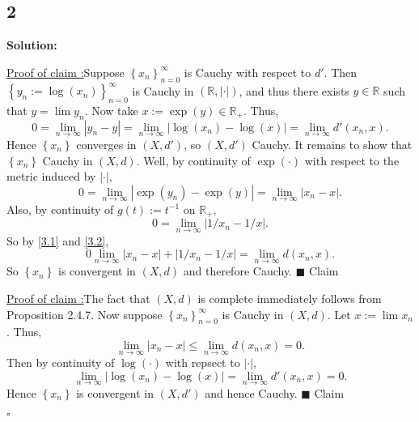 \documentclass[12pt]{article}
\newcounter{ProofCounter}
\newcounter{ClaimCounter}[ProofCounter]
\newenvironment{Solution}{\stepcounter{ProofCounter}\textbf{Solution:}}{\hfill$\square$}
\newenvironment{claim}[1]{\vspace{1mm}\stepcounter{ClaimCounter}\par\noindent\underline{\bf Claim \theClaimCounter:}\space#1}{}
\newenvironment{claimproof}[1]{\par\noindent\underline{Proof of claim \theClaimCounter:}\space#1}{\hfill $\blacksquare$ Claim \theClaimCounter}
\begin{document}
\subsection*{2}
\begin{Solution}
  \begin{claimproof}
    Suppose $\left\{ x_n \right\}_{n=0}^{\infty}$ is Cauchy with respect to $d'$. Then $\left\{ y_n := \log(x_n) \right\}_{n=0}^{\infty}$ is Cauchy in
    $(\mathbb{R}, |\cdot|)$, and thus there exists $y \in \mathbb{R}$ such that $y = \lim y_n$. Now take $x := \exp(y) \in \mathbb{R}_{+}$. Thus,
    \[
      0 = \lim_{n\rightarrow\infty}|y_n - y| = \lim_{n\rightarrow \infty}|\log(x_n) - \log(x)| = \lim_{n\rightarrow \infty}d'(x_n, x).
    \]
    Hence $\left\{ x_n \right\}$ converges in $(X, d')$, so $(X, d')$ Cauchy. It remains to show that $\left\{ x_n \right\}$ Cauchy in $(X,d)$. Well,
    by continuity of $\exp(\cdot)$ with respect to the metric induced by $|\cdot|$,
    \begin{equation}
      0 = \lim_{n\rightarrow\infty}|\exp(y_n) - \exp(y)| = \lim_{n\rightarrow\infty}|x_n - x|.
      \label{3.1}
    \end{equation}
    Also, by continuity of $g(t) := t^{-1}$ on $\mathbb{R}_{+}$,
    \begin{equation}
      0 = \lim_{n\rightarrow\infty}|1/x_n - 1/x|.
      \label{3.2}
    \end{equation}
    So by \eqref{3.1} and \eqref{3.2},
    \[
      0 \lim_{n\rightarrow\infty}|x_n - x| + |1/x_n - 1/x| = \lim_{n\rightarrow\infty}d(x_n, x).
    \]
    So $\left\{ x_n \right\}$ is convergent in $(X,d)$ and therefore Cauchy.
  \end{claimproof}

  \begin{claimproof}
    The fact that $(X,d)$ is complete immediately follows from Proposition 2.4.7. Now suppose $\left\{ x_n \right\}_{n=0}^{\infty}$ is Cauchy in
    $(X,d)$. Let $x := \lim x_n$. Thus, 
    \[
      \lim_{n\rightarrow\infty}|x_n - x| \leq \lim_{n\rightarrow\infty}d(x_n, x) = 0. 
    \]
    Then by continuity of
    $\log(\cdot)$ with repsect to $|\cdot|$, 
    \[
      \lim_{n\rightarrow\infty}|\log(x_n) - \log(x)| = \lim_{n\rightarrow\infty}d'(x_n,x) = 0.
    \]
    Hence $\left\{ x_n \right\}$ is convergent in $(X, d')$ and hence Cauchy.
  \end{claimproof}


\end{Solution}
\end{document}
